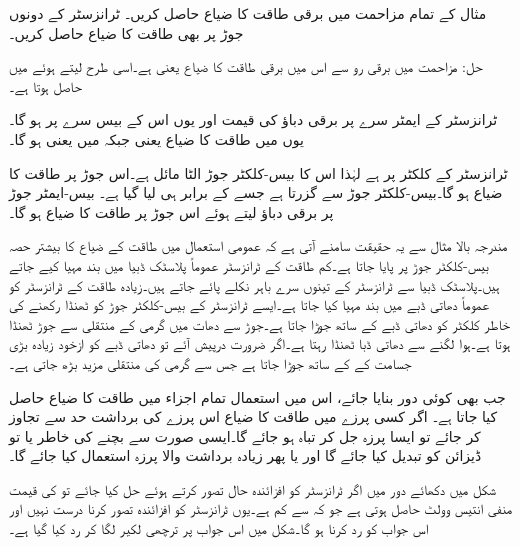 مثال   کے تمام مزاحمت میں برقی طاقت کا ضیاع حاصل کریں۔ ٹرانزسٹر کے دونوں جوڑ پر بھی طاقت کا ضیاع حاصل کریں۔

حل: مزاحمت  میں   برقی رو سے اس میں برقی طاقت کا ضیاع  یعنی  ہے۔اسی طرح  لیتے ہوئے  میں  حاصل ہوتا ہے۔

ٹرانزسٹر کے ایمٹر سرے پر برقی دباؤ  کی قیمت  اور یوں اس کے بیس سرے پر  ہو گا۔یوں  میں طاقت کا ضیاع   یعنی  جبکہ  میں  یعنی    ہو گا۔

ٹرانزسٹر کے کلکٹر  پر  ہے لہٰذا اس کا بیس-کلکٹر جوڑ  الٹا مائل ہے۔اس جوڑ پر طاقت کا ضیاع   ہو گا۔بیس-کلکٹر جوڑ سے  گزرتا ہے جسے  کے برابر ہی لیا گیا ہے۔ بیس-ایمٹر  جوڑ  پر برقی دباؤ  لیتے ہوئے اس جوڑ پر طاقت کا ضیاع  ہو گا۔ 

مندرجہ بالا مثال سے یہ حقیقت سامنے آتی ہے کہ عمومی استعمال میں طاقت کے ضیاع کا بیشتر حصہ  بیس-کلکٹر جوڑ پر  پایا جاتا ہے۔کم طاقت کے ٹرانزسٹر عموماً پلاسٹک ڈبیا میں بند مہیا کیے جاتے ہیں۔پلاسٹک ڈبیا سے ٹرانزسٹر کے تینوں سرے باہر نکلے پائے جاتے ہیں۔زیادہ طاقت کے ٹرانزسٹر کو عموماً دھاتی ڈبے میں بند مہیا کیا جاتا ہے۔ایسے ٹرانزسٹر کے بیس-کلکٹر جوڑ کو ٹھنڈا رکھنے کی خاطر کلکٹر  کو دھاتی ڈبے  کے ساتھ جوڑا جاتا ہے۔جوڑ سے دھات میں گرمی کے منتقلی سے جوڑ ٹھنڈا ہوتا ہے۔ہوا لگنے سے دھاتی ڈبا ٹھنڈا رہتا ہے۔اگر ضرورت درپیش آئے تو دھاتی ڈبے کو ازخود زیادہ بڑی جسامت کے  کے ساتھ جوڑا جاتا ہے جس سے گرمی کی منتقلی مزید بڑھ جاتی ہے۔    
 
جب بھی کوئی دور بنایا جائے، اس میں استعمال تمام اجزاء میں طاقت کا ضیاع حاصل کیا جاتا ہے۔ اگر کسی پرزے میں طاقت کا ضیاع اس پرزے کی برداشت حد سے تجاوز کر جائے تو ایسا پرزہ جل کر تباہ ہو جائے گا۔ایسی صورت سے بچنے کی خاطر یا تو ڈیزائن کو تبدیل کیا جائے گا اور یا پھر زیادہ برداشت والا پرزہ استعمال کیا جائے گا۔

شکل   میں دکھائے دور میں اگر ٹرانزسٹر کو افزائندہ حال تصور کرتے ہوئے حل کیا جائے تو  کی قیمت منفی انتیس وولٹ  حاصل ہوتی ہے جو کہ  سے کم ہے۔یوں ٹرانزسٹر کو افزائندہ تصور کرنا درست نہیں اور اس جواب کو رد کرنا ہو گا۔شکل میں اس جواب پر ترچھی لکیر لگا کر رد کیا گیا ہے۔

